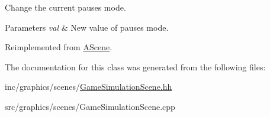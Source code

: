 Change the current pause\textquotesingle{}s mode. 


\begin{DoxyParams}{Parameters}
{\em val} & New value of pause\textquotesingle{}s mode. \\
\hline
\end{DoxyParams}


Reimplemented from \hyperlink{classAScene_a7ff45d7a24796f52d815c00770900339}{A\+Scene}.



The documentation for this class was generated from the following files\+:\begin{DoxyCompactItemize}
\item 
inc/graphics/scenes/\hyperlink{GameSimulationScene_8hh}{Game\+Simulation\+Scene.\+hh}\item 
src/graphics/scenes/Game\+Simulation\+Scene.\+cpp\end{DoxyCompactItemize}

